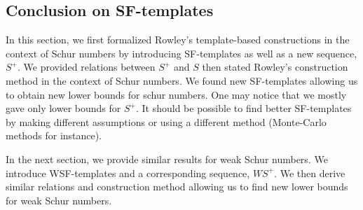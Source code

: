 \subsection{Conclusion on SF-templates}

\qquad In this section, we first formalized Rowley's template-based constructions \cite{RowleyRamsey} in the context of Schur numbers 
by introducing SF-templates as well as a new sequence, \(S^+\). We provided relations between \(S^+\) and \(S\) then 
stated Rowley's construction method in the context of Schur numbers. We found new SF-templates allowing us to obtain 
new lower bounds for schur numbers. One may notice that we mostly gave only lower bounds for \(S^+\). It should be possible to 
find better SF-templates by making different assumptions or using a different method (Monte-Carlo methods for instance).

\par
In the next section, we provide similar results for weak Schur numbers. We introduce WSF-templates and a corresponding sequence, 
\(WS^+\). We then derive similar relations and construction method allowing us to find new lower bounds for weak Schur numbers.
